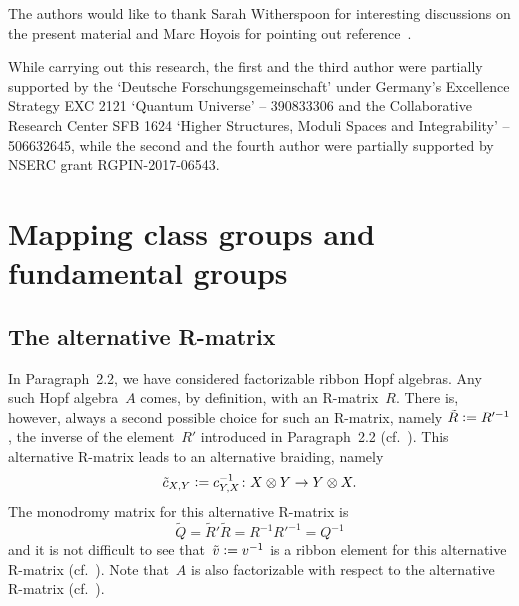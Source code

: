 \documentclass[12pt]{article}
\theoremstyle{definition}
\theoremstyle{break}
\renewcommand{\1}{\mathbbm{1}}
\newcommand{\ot}{\mathbin{\otimes}}
\newcommand{\deq}{\vcentcolon =}
\begin{document}
The authors would like to thank Sarah Witherspoon for interesting discussions on the present material and Marc Hoyois for pointing out reference~\cite{Bg}.

While carrying out this research, the first and the third author were partially supported by the `Deutsche Forschungsgemeinschaft' under Germany's Excellence Strategy EXC 2121 `Quantum Universe' -- 390833306 and the Collaborative Research Center SFB 1624 `Higher Structures, Moduli Spaces and Integrability' -- 506632645, while the second and the fourth author were partially supported by NSERC grant RGPIN-2017-06543.


\setcounter{section}{3}
\section{Mapping class groups and fundamental groups} \label{Sec:MapClFund}
\subsection{The alternative R-matrix} \label{AltRMat}
In Paragraph~2.2, we have considered factorizable ribbon Hopf algebras. Any such Hopf algebra~$A$ comes, by definition, with an R-matrix~$R$. There is, however, always a second possible choice for such an R-matrix, namely $\tilde{R} \deq R'^{-1}$, the inverse of the element~$R'$ introduced in Paragraph~2.2 (cf.~\cite[Par.~2.1, p.~17]{SZ}). This alternative R-matrix leads to an alternative braiding, namely
\[\tilde{c}_{X,Y} \deq c_{Y,X}^{-1} \colon X \ot Y \to Y \ot X.\]
The monodromy matrix for this alternative R-matrix is
\[\tilde{Q} = \tilde{R}' \tilde{R} = R^{-1} R'^{-1} = Q^{-1}\]
and it is not difficult to see that~$\tilde{v} \deq v^{-1}$ is a ribbon element for this alternative R-matrix (cf.~\cite[Par.~4.4, p.~40]{SZ}). Note that~$A$ is also factorizable with respect to the alternative R-matrix (cf.~\cite[Par.~3.2, p.~26]{SZ}).
\end{document}
